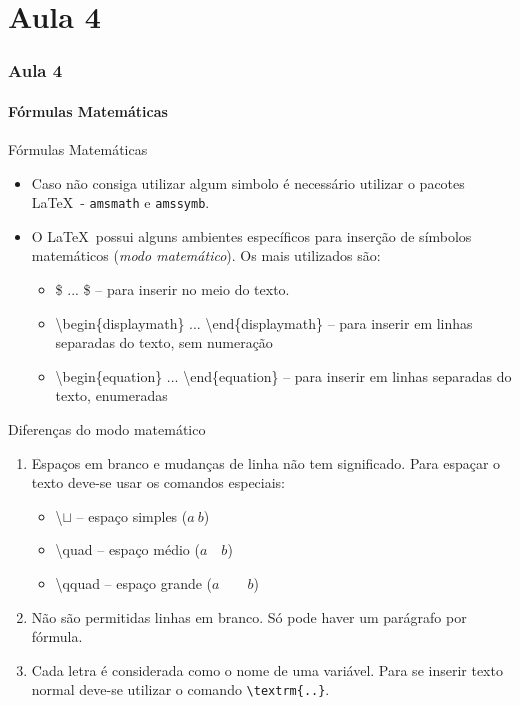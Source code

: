 
\part{Aula 4}
\section{Aula 4}

\subsection{Fórmulas Matemáticas}
\begin{frame}[fragile]{Fórmulas Matemáticas}
    \begin{itemize}
    \item Caso não consiga utilizar algum simbolo é necessário utilizar o pacotes \LaTeX\ - \verb|amsmath| e \verb|amssymb|.
    \item O \LaTeX\ possui alguns ambientes específicos para inserção de símbolos matemáticos (\textit{modo matemático}). Os mais utilizados são:
        \begin{itemize}
        \item \alert{\$} ... \alert{\$} -- para inserir no meio do texto.
        \item \alert{\textbackslash begin\{displaymath\} ... \textbackslash end\{displaymath\}} -- para inserir em linhas separadas do texto, sem numeração
        \item \alert{\textbackslash begin\{equation\} ... \textbackslash end\{equation\}} -- para inserir em linhas separadas do texto, enumeradas
        \end{itemize}
    \end{itemize}
\end{frame}

\begin{frame}[fragile]{Diferenças do modo matemático}
    \begin{enumerate}
    \item Espaços em branco e mudanças de linha não tem significado. Para espaçar o texto deve-se usar os comandos especiais:
        \begin{itemize}
        \item \alert{\textbackslash $\sqcup$} -- espaço simples ($a\ b$)
        \item \alert{\textbackslash quad} -- espaço médio ($a \quad b$)
        \item \alert{\textbackslash qquad} -- espaço grande ($a \qquad b$)
        \end{itemize}
    \item Não são permitidas linhas em branco. Só pode haver um parágrafo por fórmula.
    \item Cada letra é considerada como o nome de uma variável. Para se inserir texto normal deve-se utilizar o comando \verb|\textrm{..}|.
    \end{enumerate}
\end{frame}


